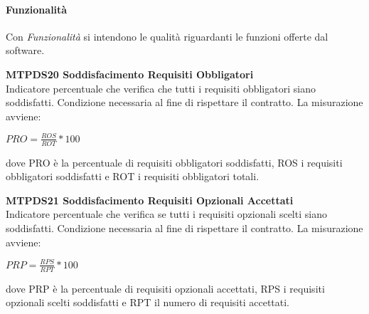 \paragraph{Funzionalità}
Con \textit{Funzionalità} si intendono le qualità riguardanti le funzioni offerte dal software.
\begin{itemize}
	\item \textbf{MTPDS20 Soddisfacimento Requisiti Obbligatori}\-\\
Indicatore percentuale che verifica che tutti i requisiti obbligatori siano soddisfatti. Condizione necessaria al fine di rispettare il contratto. La misurazione avviene:
\begin{center}
	\item $PRO = \frac{ROS}{ROT}*100$
\end{center}
dove PRO è la percentuale di requisiti obbligatori soddisfatti, ROS i requisiti obbligatori soddisfatti e ROT i requisiti obbligatori totali.

	\item \textbf{MTPDS21 Soddisfacimento Requisiti Opzionali Accettati}\-\\
Indicatore percentuale che verifica se tutti i requisiti opzionali scelti siano soddisfatti. Condizione necessaria al fine di rispettare il contratto. La misurazione avviene:
\begin{center}
	\item $PRP = \frac{RPS}{RPT}*100$
\end{center}
dove PRP è la percentuale di requisiti opzionali accettati, RPS i requisiti opzionali scelti soddisfatti e RPT il numero di requisiti accettati.
\end{itemize}

